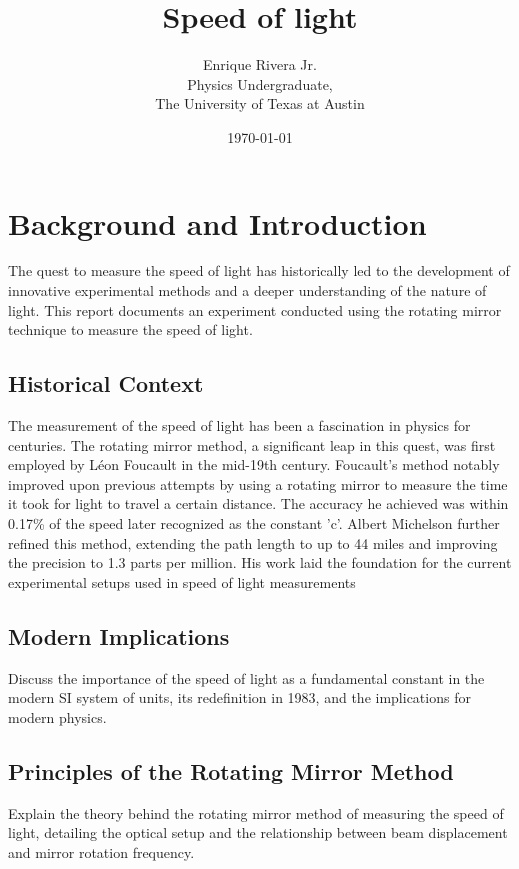 \documentclass[12pt]{article}
\title{Speed of light}
\author{Enrique Rivera Jr. \\
                Physics Undergraduate, \\ 
                The University of Texas at Austin}
\date{\today}
\begin{document}
\maketitle

\begin{abstract}        

\end{abstract}


\section{Background and Introduction}
        The quest to measure the speed of light has historically led to the development of innovative experimental methods and a deeper understanding of the nature of light. This report documents an experiment conducted using the rotating mirror technique to measure the speed of light. 

        \subsection{Historical Context}
        The measurement of the speed of light has been a fascination in physics for centuries. 
        The rotating mirror method, a significant leap in this quest, was first employed by Léon 
        Foucault in the mid-19th century. Foucault's method notably improved upon previous attempts 
        by using a rotating mirror to measure the time it took for light to travel a certain 
        distance. The accuracy he achieved was within 0.17\% of the speed later recognized as the 
        constant 'c'. Albert Michelson further refined this method, extending the path length 
        to up to 44 miles and improving the precision to 1.3 parts per million. His work laid 
        the foundation for the current experimental setups used in speed of light measurements
        
        \subsection{Modern Implications}
        Discuss the importance of the speed of light as a fundamental constant in the modern SI system of units, its redefinition in 1983, and the implications for modern physics.

        \subsection{Principles of the Rotating Mirror Method}
        Explain the theory behind the rotating mirror method of measuring the speed of light, detailing the optical setup and the relationship between beam displacement and mirror rotation frequency.
    
\end{document}
